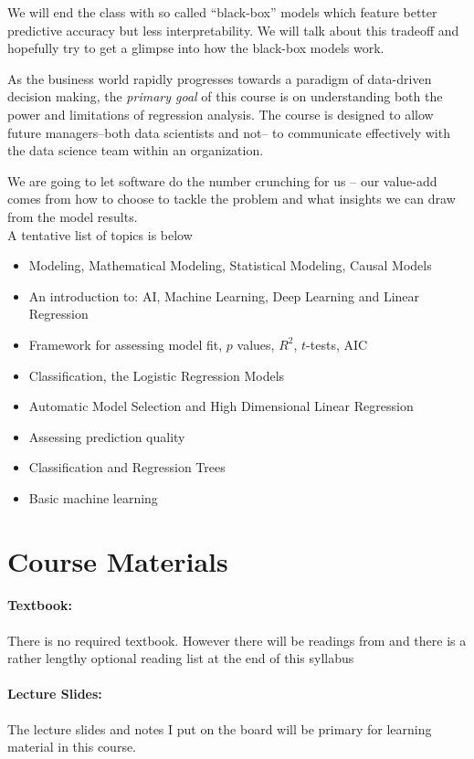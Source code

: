 \documentclass[12pt]{article}
\newcommand{\qu}[1]{``#1''}
\begin{document}
We will end the class with so called \qu{black-box} models which feature better predictive accuracy but less interpretability. We will talk about this tradeoff and hopefully try to get a glimpse into how the black-box models work.

As the business world rapidly progresses towards a paradigm of data-driven decision making, the \textit{primary goal} of this course is on understanding both the power and limitations of regression analysis. The course is designed to allow future managers--both data scientists and not-- to communicate effectively with the data science team within an organization.

We are going to let software do the number crunching for us -- our value-add comes from how to choose to tackle the problem and what insights we can draw from the model results. \\
  
A tentative list of topics is below

\begin{itemize}
\item Modeling, Mathematical Modeling, Statistical Modeling, Causal Models
\item An introduction to: AI, Machine Learning, Deep Learning and Linear Regression
\item Framework for assessing model fit, $p$ values, $R^2$, $t$-tests, AIC
\item Classification, the Logistic Regression Models
\item Automatic Model Selection and High Dimensional Linear Regression
\item Assessing prediction quality
\item Classification and Regression Trees
\item Basic machine learning
\end{itemize}


\section*{Course Materials}


\paragraph{Textbook:} There is no required textbook. However there will be readings from \cite{silver2012} and there is a rather lengthy optional reading list at the end of this syllabus


\paragraph{Lecture Slides:} The lecture slides and notes I put on the board will be primary for learning material in this course.
\end{document}
